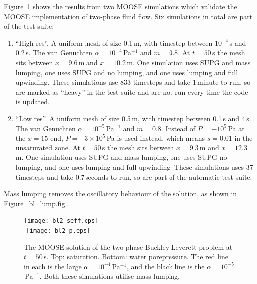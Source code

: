 \documentclass[]{scrreprt}
\begin{document}
Figure~\ref{satfront2.figa} shows the results from two MOOSE
simulations which validate the MOOSE implementation of two-phase fluid
flow.  Six simulations in total are part of the test suite:
\begin{enumerate}
\item ``High res''.  A uniform mesh of size 0.1\,m, with timestep between
  $10^{-4}$\,s and 0.2\,s.  The van Genuchten
  $\alpha=10^{-4}$\,Pa$^{-1}$ and $m=0.8$.  At $t=50$\,s the mesh sits
  between $x=9.6$\,m and $x=10.2$\,m.  One simulation uses SUPG and mass
  lumping, one uses SUPG and no lumping, and one uses lumping and full upwinding.  These simulations use 833
  timesteps and take 1\,minute
  to run, so are marked as ``heavy'' in the test suite and are not run
  every time the code is updated.
\item ``Low res''.  A uniform mesh of size 0.5\,m, with timestep between 0.1\,s and
  4\,s.  The van Genuchten 
  $\alpha=10^{-5}$\,Pa$^{-1}$ and $m=0.8$.  Instead of $P=-10^{5}$\,Pa
  at the $x=15$ end, $P=-3\times 10^{5}$\,Pa is used instead, which
  means $s=0.01$ in the unsaturated zone.  At $t=50$\,s the mesh sits
  between $x=9.3$\,m and $x=12.3$\,m.  One simulation uses SUPG and mass
  lumping, one uses SUPG no lumping, and one uses lumping and full upwinding.  These simulations uses 37
  timesteps and take 0.7\,seconds to run, so are part of the automatic
  test suite.
\end{enumerate}
Mass lumping removes the oscillatory behaviour of the solution, as
shown in Figure~\ref{bl_lump.fig}.



\begin{figure}[htb]
\begin{center}
\texttt{[image: bl2\_seff.eps]} \\
$\mbox{}$
\texttt{[image: bl2\_p.eps]} \\
\caption{The MOOSE solution of the two-phase Buckley-Leverett problem at
  $t=50$\,s.  Top: saturation.  Bottom: water porepressure.  The red line in
  each is the large $\alpha=10^{-4}$\,Pa$^{-1}$, and the black line is
  the $\alpha=10^{-5}$\,Pa$^{-1}$.  Both these simulations utilise
  mass lumping.}
\label{satfront2.figa}
\end{center}
\end{figure}
\end{document}
